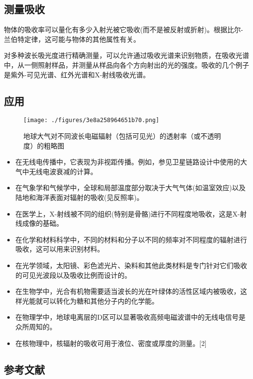 \subsection{测量吸收}

物体的吸收率可以量化有多少入射光被它吸收(而不是被反射或折射)。根据比尔-兰伯特定律，这可能与物体的其他属性有关。

对多种波长吸光度进行精确测量，可以允许通过吸收光谱来识别物质，在吸收光谱中，从一侧照射样品，并测量从样品向各个方向射出的光的强度。吸收的几个例子是紫外-可见光谱、红外光谱和X-射线吸收光谱。

\subsection{应用}


\begin{figure}[ht]
\centering
\texttt{[image: ./figures/3e8a258964651b70.png]}
\caption{地球大气对不同波长电磁辐射（包括可见光）的透射率（或不透明度）的粗略图} \label{fig_XSGX_2}
\end{figure}

\begin{itemize}
\item 在无线电传播中，它表现为非视距传播。例如，参见卫星链路设计中使用的大气中无线电波衰减的计算。
\item 在气象学和气候学中，全球和局部温度部分取决于大气气体(如温室效应)以及陆地和海洋表面对辐射的吸收(见反照率)。
\item 在医学上，X-射线被不同的组织(特别是骨骼)进行不同程度地吸收，这是X-射线成像的基础。
\item 在化学和材料科学中，不同的材料和分子以不同的频率对不同程度的辐射进行吸收，这可以用来识别材料。
\item 在光学领域，太阳镜、彩色滤光片、染料和其他此类材料是专门针对它们吸收的可见光波段以及吸收比例而设计的。
\item 在生物学中，光合有机物需要适当波长的光在叶绿体的活性区域内被吸收，这样光能就可以转化为糖和其他分子内的化学能。
\item 在物理学中，地球电离层的D区可以显著吸收高频电磁波谱中的无线电信号是众所周知的。
\item 在核物理中，核辐射的吸收可用于液位、密度或厚度的测量。[2]
\end{itemize}

\subsection{参考文献}

